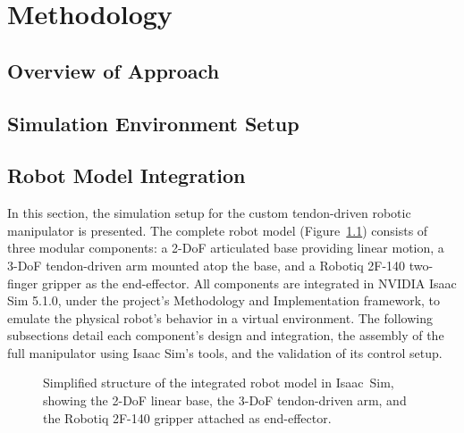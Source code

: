 \chapter{Methodology}\label{ch:methodology}

\section{Overview of Approach}

\section{Simulation Environment Setup}

\section{Robot Model Integration} %

In this section, the simulation setup for the custom tendon-driven robotic manipulator is presented. The complete robot model (Figure~\ref{fig:robot-structure}) consists of three modular components: a 2-\ac{DoF} articulated base providing linear motion, a 3-\ac{DoF} tendon-driven arm mounted atop the base, and a Robotiq 2F-140 two-finger gripper as the end-effector. All components are integrated in NVIDIA Isaac Sim 5.1.0, under the project's Methodology and Implementation framework, to emulate the physical robot's behavior in a virtual environment. The following subsections detail each component's design and integration, the assembly of the full manipulator using Isaac Sim's tools, and the validation of its control setup.

\begin{figure}[ht!]
\centering
{}
\caption[Integrated tendon-driven robot model]{Simplified structure of the integrated robot model in Isaac~Sim, showing the 2-\acs{DoF} linear base, the 3-\acs{DoF} tendon-driven arm, and the Robotiq 2F-140 gripper attached as end-effector.}\label{fig:robot-structure}
\end{figure}


